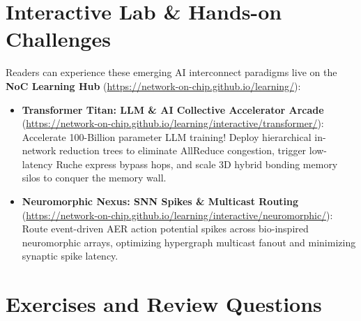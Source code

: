 \section{Interactive Lab \& Hands-on Challenges}
\label{sec:ch12_interactive}

Readers can experience these emerging AI interconnect paradigms live on the \textbf{NoC Learning Hub} (\url{https://network-on-chip.github.io/learning/}):
\begin{itemize}
    \item \textbf{Transformer Titan: LLM \& AI Collective Accelerator Arcade} (\url{https://network-on-chip.github.io/learning/interactive/transformer/}): Accelerate 100-Billion parameter LLM training! Deploy hierarchical in-network reduction trees to eliminate AllReduce congestion, trigger low-latency Ruche express bypass hops, and scale 3D hybrid bonding memory silos to conquer the memory wall.
    \item \textbf{Neuromorphic Nexus: SNN Spikes \& Multicast Routing} (\url{https://network-on-chip.github.io/learning/interactive/neuromorphic/}): Route event-driven AER action potential spikes across bio-inspired neuromorphic arrays, optimizing hypergraph multicast fanout and minimizing synaptic spike latency.
\end{itemize}

\section{Exercises and Review Questions}
\label{sec:ch12_exercises}

